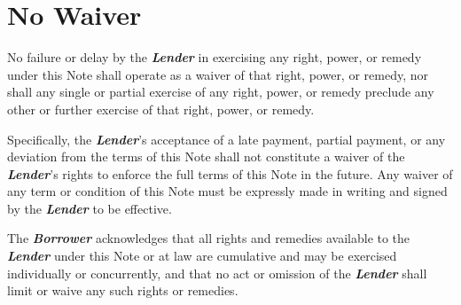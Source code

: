 
\section{No Waiver}
\label{sec:waiver}

No failure or delay by the \textbf{\textit{Lender}} in exercising any right, power, or remedy under this Note shall operate as a waiver of that right, power, or remedy, nor shall any single or partial exercise of any right, power, or remedy preclude any other or further exercise of that right, power, or remedy.

\vspace{0.3cm}

\noindent Specifically, the \textbf{\textit{Lender}}’s acceptance of a late payment, partial payment, or any deviation from the terms of this Note shall not constitute a waiver of the \textbf{\textit{Lender}}’s rights to enforce the full terms of this Note in the future. Any waiver of any term or condition of this Note must be expressly made in writing and signed by the \textbf{\textit{Lender}} to be effective.

\vspace{0.3cm}

\noindent The \textbf{\textit{Borrower}} acknowledges that all rights and remedies available to the \textbf{\textit{Lender}} under this Note or at law are cumulative and may be exercised individually or concurrently, and that no act or omission of the \textbf{\textit{Lender}} shall limit or waive any such rights or remedies.

